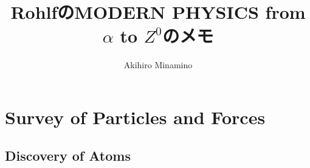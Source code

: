 \documentclass[11pt, oneside]{article}   	%
\title{RohlfのMODERN PHYSICS from $\alpha$ to $Z^{0}$のメモ}
\author{Akihiro Minamino}
\begin{document}
\maketitle
\section{Survey of Particles and Forces}
\subsection{Discovery of Atoms}
\end{document}
